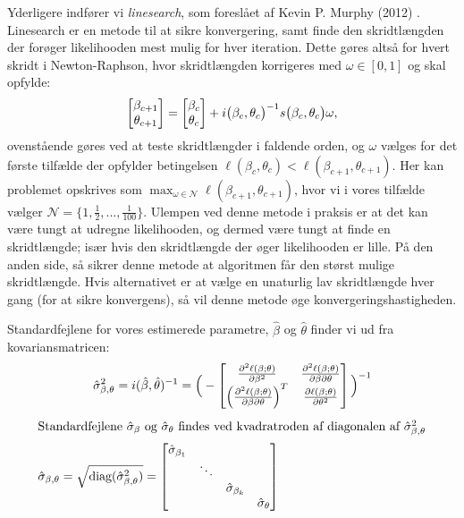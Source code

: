 \documentclass[11pt,a4paper]{article}
\begin{document}
Yderligere indfører vi \textit{linesearch}, som foreslået af Kevin P. Murphy (2012) \cite{LineSearch}. Linesearch er en metode til at sikre konvergering, samt finde den skridtlængden der forøger likelihooden mest mulig for hver iteration. Dette gøres altså for hvert skridt i Newton-Raphson, hvor skridtlængden korrigeres med $\omega \in [0,1]$ og skal opfylde:\\
\begin{align*}
\begin{bmatrix} \beta_{c+1}\\\theta_{c+1}\end{bmatrix} = \begin{bmatrix} \beta_c\\\theta_c\end{bmatrix} + i\big{(}\beta_c,\theta_c\big{)}^{-1}s\big{(}\beta_c,\theta_c\big{)}\omega,
\end{align*}
ovenstående gøres ved at teste skridtlængder i faldende orden, og $\omega$ vælges for det første tilfælde der opfylder betingelsen $\ell(\beta_c,\theta_c)<\ell(\beta_{c+1},\theta_{c+1})$. 
Her kan problemet opskrives som 
$\max_{\omega \in \mathcal{N}} \ell(\beta_{c+1},\theta_{c+1})$, hvor vi i vores tilfælde vælger 
$\mathcal{N} = \{1,\frac{1}{2},...,\frac{1}{100}\}$. Ulempen ved denne metode i praksis er at det kan være tungt at udregne likelihooden, og dermed være tungt at finde en skridtlængde; især hvis den skridtlængde der øger likelihooden er lille. På den anden side, så sikrer denne metode at algoritmen får den størst mulige skridtlængde. Hvis alternativet er at vælge en unaturlig lav skridtlængde hver gang (for at sikre konvergens), så vil denne metode øge konvergeringshastigheden.\\\par
Standardfejlene for vores estimerede parametre, $\hat{\beta}$ og $\hat{\theta}$ finder vi ud fra kovariansmatricen: 
\begin{align*}
&\hat{\sigma}^2_{\beta,\theta}=i(\hat{\beta},\hat{\theta})^{-1}=
\Big{(}-\begin{bmatrix}
\frac{\partial^2 \ell(\beta;\theta)}{\partial \beta^2} &\frac{\partial^2 \ell(\beta;\theta)}{\partial \beta \partial \theta} \\
\Big{(}\frac{\partial^2 \ell(\beta;\theta)}{\partial \beta \partial \theta}\Big{)}^T & \frac{\partial \ell(\beta;\theta)}{\partial \theta^2}
\end{bmatrix}\Big{)}^{-1}\\
\end{align*}
\begin{align}
\intertext{Standardfejlene $\hat{\sigma}_\beta$ og $\hat{\sigma}_\theta$ findes ved kvadratroden af diagonalen af $\hat{\sigma}^2_{\beta,\theta}$}
\hat{\sigma}_{\beta,\theta}=\sqrt{\text{diag}(\hat{\sigma}^2_{\beta,\theta})}=
\begin{bmatrix}
\hat{\sigma}_{\beta_1}& &\\
& \ddots & \\
& & \hat{\sigma}_{\beta_k} \\
& & & \hat{\sigma}_{\theta}
\end{bmatrix}
\end{align}
\end{document}

